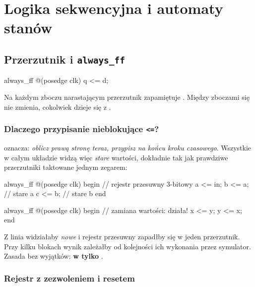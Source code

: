 \chapter{Logika sekwencyjna i automaty stanów}
\label{ch:sekw}


\section{Przerzutnik i \texttt{always\_ff}}

\begin{sv}
always_ff @(posedge clk) q <= d;
\end{sv}

Na każdym zboczu narastającym  przerzutnik zapamiętuje .
Między zboczami  się nie zmienia, cokolwiek dzieje się z .

\subsection*{Dlaczego przypisanie nieblokujące \texttt{<=}?}

\code{<=} oznacza: \emph{oblicz prawą stronę teraz, przypisz na końcu
kroku czasowego}. Wszystkie \code{<=} w całym układzie widzą więc \emph{stare}
wartości, dokładnie tak jak prawdziwe przerzutniki taktowane jednym zegarem:

\begin{sv}
always_ff @(posedge clk) begin   // rejestr przesuwny 3-bitowy
  a <= in;
  b <= a;                        // stare a
  c <= b;                        // stare b
end

always_ff @(posedge clk) begin   // zamiana wartości: działa!
  x <= y;
  y <= x;
end
\end{sv}

\begin{pulapka}[\texttt{=} w \texttt{always\_ff}]
Z \code{=} linia  widziałaby \emph{nowe}  i rejestr
przesuwny zapadłby się w jeden przerzutnik. Przy kilku blokach 
wynik zależałby od kolejności ich wykonania przez symulator. Zasada bez
wyjątków: \textbf{w  tylko \code{<=}}.
\end{pulapka}

\subsection*{Rejestr z zezwoleniem i resetem}

